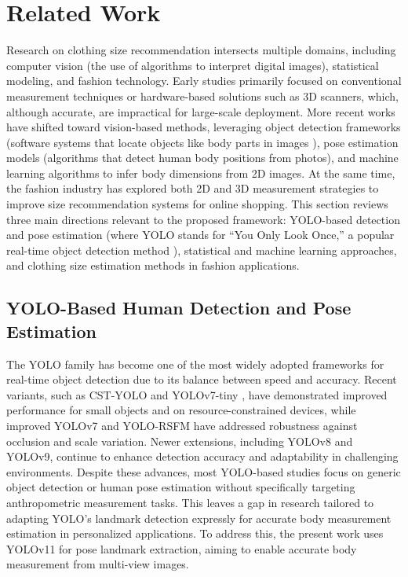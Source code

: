 \documentclass{llncs}
\begin{document}
\section{Related Work}
Research on clothing size recommendation intersects multiple domains, including computer vision (the use of algorithms to interpret digital images), statistical modeling, and fashion technology.
Early studies primarily focused on conventional measurement techniques or hardware-based solutions such as 3D scanners, which, although accurate, are impractical for large-scale deployment. 
More recent works have shifted toward vision-based methods, leveraging object detection frameworks (software systems that locate objects like body parts in images ), 
    pose estimation models (algorithms that detect human body positions from photos), and machine learning algorithms to infer body dimensions from 2D images. 
At the same time, the fashion industry has explored both 2D and 3D measurement strategies to improve size recommendation systems for online shopping. 
This section reviews three main directions relevant to the proposed framework: YOLO-based detection and pose estimation (where YOLO stands for “You Only Look Once,” a popular real-time object detection method ), 
    statistical and machine learning approaches, and clothing size estimation methods in fashion applications.
\subsection{YOLO-Based Human Detection and Pose Estimation}

The YOLO family has become one of the most widely adopted frameworks for real-time object detection due to its balance between speed and accuracy. 
Recent variants, such as CST-YOLO \cite{ref3} and YOLOv7-tiny \cite{ref4}, have demonstrated improved performance for small objects and on resource-constrained devices, while improved YOLOv7 \cite{ref5} and YOLO-RSFM \cite{ref6} have addressed robustness against occlusion and scale variation. 
Newer extensions, including YOLOv8 and YOLOv9, continue to enhance detection accuracy and adaptability in challenging environments. 
Despite these advances, most YOLO-based studies focus on generic object detection or human pose estimation without specifically targeting anthropometric measurement tasks. 
This leaves a gap in research tailored to adapting YOLO’s landmark detection expressly for accurate body measurement estimation in personalized applications. 
To address this, the present work uses YOLOv11 for pose landmark extraction, aiming to enable accurate body measurement from multi-view images.
\end{document}
